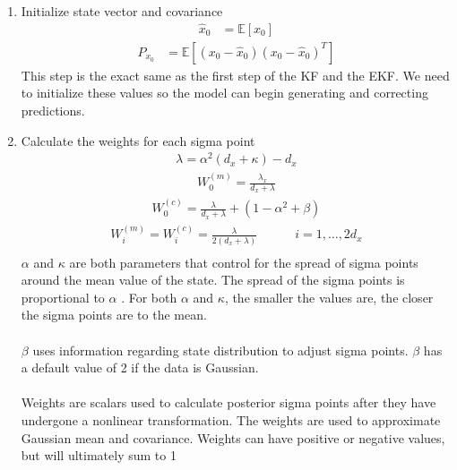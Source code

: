 \begin{enumerate}
    \item Initialize state vector and covariance
    \begin{align*}
        \hat{x}_{0} &= \mathbb{E}[x_{0}] 
       \end{align*}
        \begin{align*}
        P_{x_{0}} &= \mathbb{E}[(x_{0}-\hat{x}_{0})(x_{0}-\hat{x}_{0})^{T}] 
    \end{align*}
    This step is the exact same as the first step of the KF and the EKF. We need to initialize these values so the model can begin generating and correcting predictions.
        \item Calculate the weights for each sigma point 
    \begin{align*}
        \lambda = \alpha^{2}(d_{x}+\kappa)-d_{x} 
         \end{align*}
        \begin{align*}
        W^{(m)}_{0} = \frac{\lambda_{x}}{d_{x}+ \lambda} 
         \end{align*}
        \begin{align*}
        W^{(c)}_{0} = \frac{\lambda}{d_{x}+ \lambda} + (1 - \alpha^{2} + \beta) 
         \end{align*}
        \begin{align*}
        W^{(m)}_{i} = W^{(c)}_{i} = \frac{\lambda}{2(d_{x}+ \lambda) } \quad \quad \quad i=1,\dots,2d_{x} \\
            \end{align*}
       $\alpha$ and $\kappa$ are both parameters that control for the spread of sigma points around the mean value of the state. The spread of the sigma points is proportional to $\alpha$ . For both $\alpha$ and $\kappa $,  the smaller the values are, the closer the sigma points are to the mean.\\ \\
       $\beta$ uses information regarding state distribution to adjust sigma points. $\beta$ has a default value of 2 if the data is Gaussian. \\ \\
    Weights are scalars used to calculate posterior sigma points after they have undergone a nonlinear transformation. The weights are used to approximate Gaussian mean and covariance. Weights can have positive or negative values, but will ultimately sum to 1 \cite{article6}
    

\end{enumerate}
